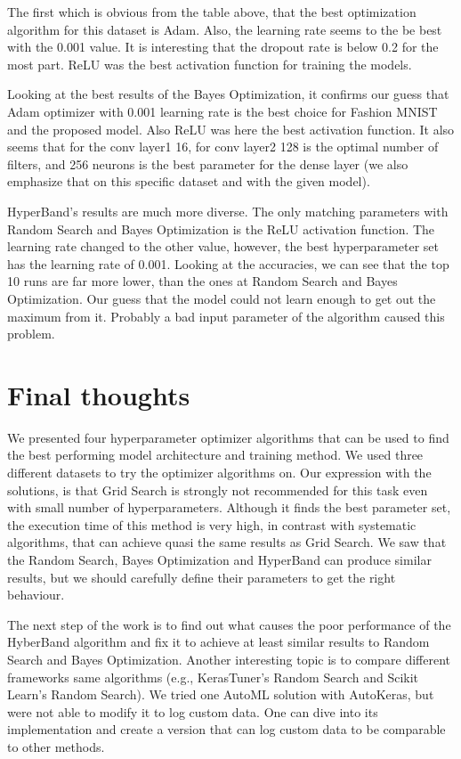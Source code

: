 \documentclass[conference]{IEEEtran}
\begin{document}
The first which is obvious from the table above, that the best optimization algorithm for this dataset is Adam. Also, the learning rate seems to the be best with the 0.001 value. It is interesting that the dropout rate is below 0.2 for the most part. ReLU was the best activation function for training the models.

\vspace{-0.5cm}

Looking at the best results of the Bayes Optimization, it confirms our guess that Adam optimizer with 0.001 learning rate is the best choice for Fashion MNIST and the proposed model. Also ReLU was here the best activation function. It also seems that for the conv layer1 16, for conv layer2 128 is the optimal number of filters, and 256 neurons is the best parameter for the dense layer (we also emphasize that on this specific dataset and with the given model).

\vspace{-0.5cm}

HyperBand's results are much more diverse. The only matching parameters with Random Search and Bayes Optimization is the ReLU activation function. The learning rate changed to the other value, however, the best hyperparameter set has the learning rate of 0.001. Looking at the accuracies, we can see that the top 10 runs are far more lower, than the ones at Random Search and Bayes Optimization. Our guess that the model could not learn enough to get out the maximum from it. Probably a bad input parameter of the algorithm caused this problem.

\section{Final thoughts}
We presented four hyperparameter optimizer algorithms that can be used to find the best performing model architecture and training method. We used three different datasets to try the optimizer algorithms on. Our expression with the solutions, is that Grid Search is strongly not recommended for this task even with small number of hyperparameters. Although it finds the best parameter set, the execution time of this method is very high, in contrast with systematic algorithms, that can achieve quasi the same results as Grid Search. We saw that the Random Search, Bayes Optimization and HyperBand can produce similar results, but we should carefully define their parameters to get the right behaviour.

The next step of the work is to find out what causes the poor performance of the HyberBand algorithm and fix it to achieve at least similar results to Random Search and Bayes Optimization. Another interesting topic is to compare different frameworks same algorithms (e.g., KerasTuner's Random Search and Scikit Learn's Random Search). We tried one AutoML solution with AutoKeras, but were not able to modify it to log custom data. One can dive into its implementation and create a version that can log custom data to be comparable to other methods.



\end{document}
